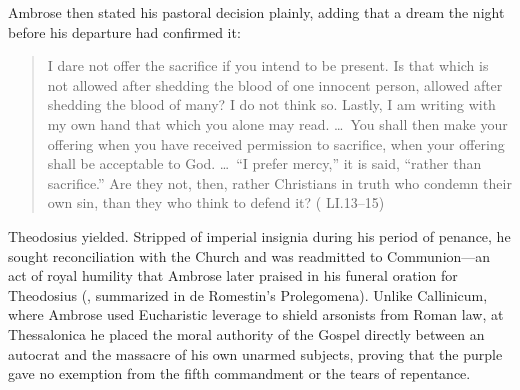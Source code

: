 Ambrose then stated his pastoral decision plainly, adding that a dream the night before his departure had confirmed it:

\begin{quote}
I dare not offer the sacrifice if you intend to be present. Is that which is not allowed after shedding the blood of one innocent person, allowed after shedding the blood of many? I do not think so. Lastly, I am writing with my own hand that which you alone may read. \ldots\ You shall then make your offering when you have received permission to sacrifice, when your offering shall be acceptable to God. \ldots\ ``I prefer mercy,'' it is said, ``rather than sacrifice.'' Are they not, then, rather Christians in truth who condemn their own sin, than they who think to defend it? ( LI.13--15)
\end{quote}


Theodosius yielded. Stripped of imperial insignia during his period of penance, he sought reconciliation with the Church and was readmitted to Communion---an act of royal humility that Ambrose later praised in his funeral oration for Theodosius (, summarized in de Romestin's Prolegomena). Unlike Callinicum, where Ambrose used Eucharistic leverage to shield arsonists from Roman law, at Thessalonica he placed the moral authority of the Gospel directly between an autocrat and the massacre of his own unarmed subjects, proving that the purple gave no exemption from the fifth commandment or the tears of repentance.
